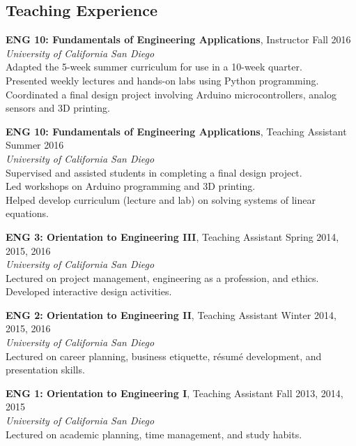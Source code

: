 \documentclass[]{res}
\begin{document}
\begin{resume}
\section{Teaching Experience}
\vspace{0.1in}

\textbf{ENG 10: Fundamentals of Engineering Applications}, Instructor \hfill Fall 2016 \\
\textit{University of California San Diego} \\
Adapted the 5-week summer curriculum for use in a 10-week quarter. \\
Presented weekly lectures and hands-on labs using Python programming. \\
Coordinated a final design project involving Arduino microcontrollers, analog sensors and 3D printing.

\textbf{ENG 10: Fundamentals of Engineering Applications}, Teaching Assistant \hfill Summer 2016 \\
\textit{University of California San Diego} \\
Supervised and assisted students in completing a final design project. \\
Led workshops on Arduino programming and 3D printing. \\
Helped develop curriculum (lecture and lab) on solving systems of linear equations.

\textbf{ENG 3: Orientation to Engineering III}, Teaching Assistant \hfill Spring 2014, 2015, 2016 \\
\textit{University of California San Diego} \\
Lectured on project management, engineering as a profession, and ethics. \\
Developed interactive design activities.

\textbf{ENG 2: Orientation to Engineering II}, Teaching Assistant \hfill Winter 2014, 2015, 2016 \\
\textit{University of California San Diego} \\
Lectured on career planning, business etiquette, r\'esum\'e development, and presentation skills.

\textbf{ENG 1: Orientation to Engineering I}, Teaching Assistant \hfill Fall 2013, 2014, 2015 \\
\textit{University of California San Diego} \\
Lectured on academic planning, time management, and study habits.


%



\end{resume}
\end{document}
